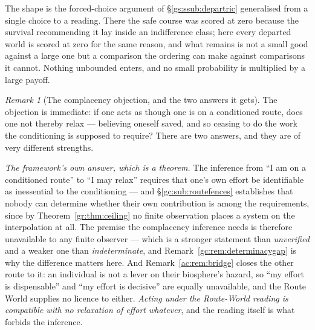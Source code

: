 \documentclass[11pt]{article}
\numberwithin{equation}{section}
\theoremstyle{plain}
\theoremstyle{definition}
\theoremstyle{remark}
\newtheorem{remark}[theorem]{Remark}
\begin{document}
The shape is the forced-choice argument of \S\ref{gs:ssub:departric}
generalised from a single choice to a reading. There the safe course was
scored at zero because the survival recommending it lay inside an
indifference class; here every departed world is scored at zero for the
same reason, and what remains is not a small good against a large one
but a comparison the ordering can make against comparisons it cannot.
Nothing unbounded enters, and no small probability is multiplied by a
large payoff.

\begin{remark}[The complacency objection, and the two answers it
gets]\label{gc:rem:complacency}
The objection is immediate: if one acts as though one is on a
conditioned route, does one not thereby relax --- believing oneself
saved, and so ceasing to do the work the conditioning is supposed to
require? There are two answers, and they are of very different
strengths.

\emph{The framework's own answer, which is a theorem.} The inference
from ``I am on a conditioned route'' to ``I may relax'' requires that
one's own effort be identifiable as inessential to the conditioning ---
and \S\ref{gc:sub:routefences} establishes that nobody can determine
whether their own contribution is among the requirements, since by
Theorem~\ref{gr:thm:ceiling} no finite observation places a system on
the interpolation at all. The premise the complacency
inference needs is therefore unavailable to any finite observer --- which
is a stronger statement than \emph{unverified} and a weaker one than
\emph{indeterminate}, and Remark~\ref{gc:rem:determinacygap} is why the
difference matters here. And
Remark~\ref{ac:rem:bridge} closes the other route to it: an individual
is not a lever on their biosphere's hazard, so ``my effort is
dispensable'' and ``my effort is decisive'' are equally unavailable, and
the Route World supplies no licence to either. \emph{Acting under the
Route-World reading is compatible with no relaxation of effort
whatever}, and the reading itself is what forbids the inference.


\end{remark}
\end{document}

